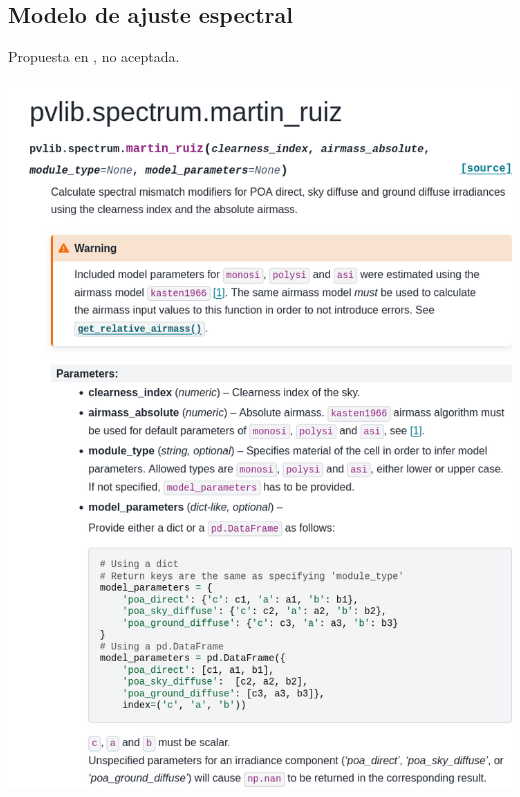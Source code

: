 \begin{myparindent}{0pt}

\newpage\section{Modelo de ajuste espectral} \label{sct:doc_modelo_nuria}

Propuesta en , no aceptada.

\includegraphics[width=\linewidth,height=0.9\textheight,keepaspectratio]{images/docs_funcs_cut/martin_ruiz_0.png}


\end{myparindent}
